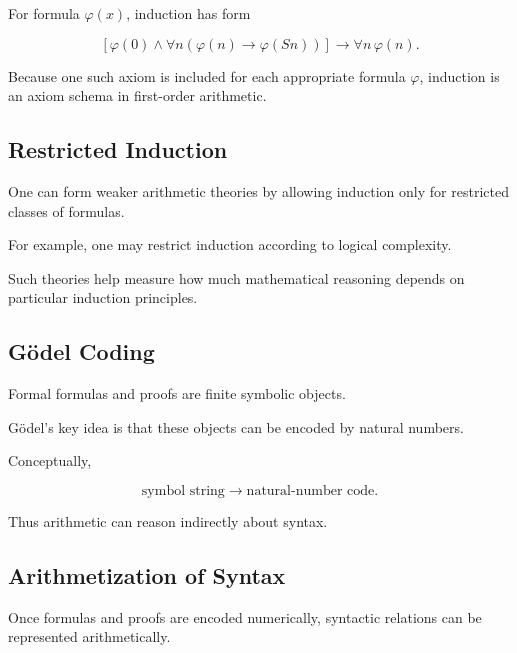 For formula \(\varphi(x)\), induction has form

\[
\boxed{
\left[
\varphi(0)
\land
\forall n
(
\varphi(n)\rightarrow\varphi(Sn)
)
\right]
\rightarrow
\forall n\,\varphi(n).
}
\]

Because one such axiom is included for each appropriate formula
\(\varphi\), induction is an axiom schema in first-order arithmetic.

\subsection{Restricted Induction}
\label{subsec:restricted-induction}

One can form weaker arithmetic theories by allowing induction only for
restricted classes of formulas.

For example, one may restrict induction according to logical complexity.

Such theories help measure how much mathematical reasoning depends on
particular induction principles.

\subsection{Gödel Coding}
\label{subsec:godel-coding}

Formal formulas and proofs are finite symbolic objects.

Gödel's key idea is that these objects can be encoded by natural numbers.

Conceptually,

\[
\boxed{
\text{symbol string}
\longrightarrow
\text{natural-number code}.
}
\]

Thus arithmetic can reason indirectly about syntax.

\subsection{Arithmetization of Syntax}
\label{subsec:arithmetization-of-syntax}

Once formulas and proofs are encoded numerically, syntactic relations can
be represented arithmetically.

